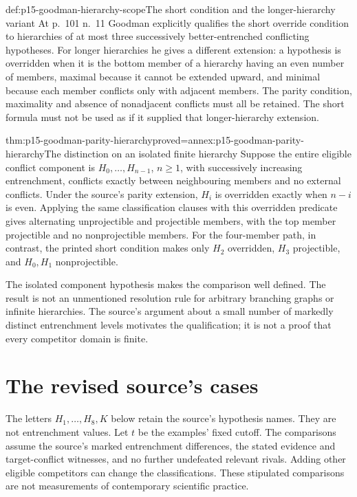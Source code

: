 \begin{proofboundary}{def:p15-goodman-hierarchy-scope}{The short condition and the longer-hierarchy variant}
At p.~101 n.~11 Goodman explicitly qualifies the short override condition
to hierarchies of at most three successively better-entrenched conflicting
hypotheses. For longer hierarchies he gives a different extension: a
hypothesis is overridden when it is the bottom member of a hierarchy
having an even number of members, maximal because it cannot be extended
upward, and minimal because each member conflicts only with adjacent
members. The parity condition, maximality and absence of nonadjacent
conflicts must all be retained. The short formula must not be used as
if it supplied that longer-hierarchy extension.
\end{proofboundary}

\begin{hblemma}{thm:p15-goodman-parity-hierarchy}{proved=annex:p15-goodman-parity-hierarchy}{The distinction on an isolated finite hierarchy}
Suppose the entire eligible conflict component is
$H_0,\ldots,H_{n-1}$, $n\ge1$, with successively increasing entrenchment,
conflicts exactly between neighbouring members and no external conflicts.
Under the source's parity extension, $H_i$ is overridden exactly when
$n-i$ is even. Applying the same classification clauses with this
overridden predicate gives alternating unprojectible and projectible
members, with the top member projectible and no nonprojectible members.
For the four-member path, in contrast, the printed short condition makes
only $H_2$ overridden, $H_3$ projectible, and $H_0,H_1$ nonprojectible.
\end{hblemma}

The isolated component hypothesis makes the comparison well defined.
The result is not an unmentioned resolution rule for arbitrary branching
graphs or infinite hierarchies. The source's argument about a small number
of markedly distinct entrenchment levels motivates the qualification;
it is not a proof that every competitor domain is finite.

\section{The revised source's cases}
\label{sec:p15-goodman-revised-cases}

The letters $H_1,\ldots,H_8,K$ below retain the source's hypothesis
names. They are not entrenchment values. Let $t$ be the examples' fixed
cutoff. The comparisons assume the source's marked entrenchment differences,
the stated evidence and target-conflict witnesses, and no further
undefeated relevant rivals. Adding other eligible competitors can change
the classifications. These stipulated comparisons are not measurements
of contemporary scientific practice.

